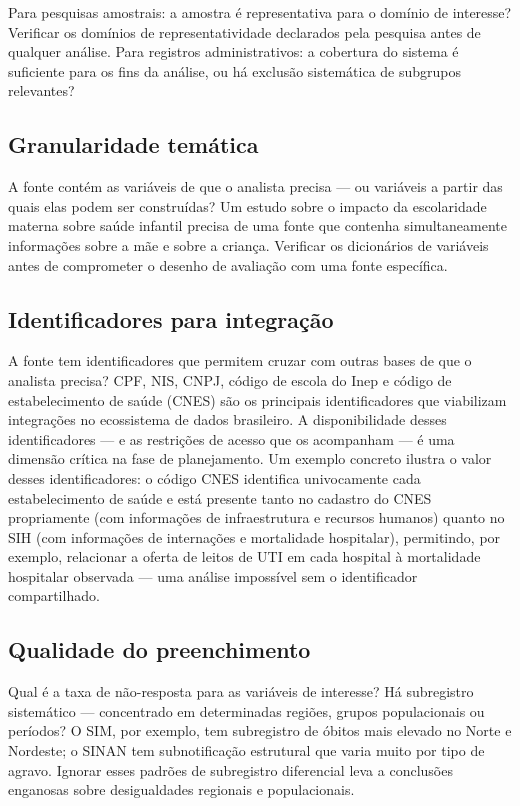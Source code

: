 Para pesquisas amostrais: a amostra é representativa para o domínio de interesse? Verificar os domínios de representatividade declarados pela pesquisa antes de qualquer análise. Para registros administrativos: a cobertura do sistema é suficiente para os fins da análise, ou há exclusão sistemática de subgrupos relevantes?

\subsection{Granularidade temática}

A fonte contém as variáveis de que o analista precisa --- ou variáveis a partir das quais elas podem ser construídas? Um estudo sobre o impacto da escolaridade materna sobre saúde infantil precisa de uma fonte que contenha simultaneamente informações sobre a mãe e sobre a criança. Verificar os dicionários de variáveis antes de comprometer o desenho de avaliação com uma fonte específica.

\subsection{Identificadores para integração}

A fonte tem identificadores que permitem cruzar com outras bases de que o analista precisa? CPF, NIS, CNPJ, código de escola do Inep e código de estabelecimento de saúde (CNES) são os principais identificadores que viabilizam integrações no ecossistema de dados brasileiro. A disponibilidade desses identificadores --- e as restrições de acesso que os acompanham --- é uma dimensão crítica na fase de planejamento. Um exemplo concreto ilustra o valor desses identificadores: o código CNES identifica univocamente cada estabelecimento de saúde e está presente tanto no cadastro do CNES propriamente (com informações de infraestrutura e recursos humanos) quanto no SIH (com informações de internações e mortalidade hospitalar), permitindo, por exemplo, relacionar a oferta de leitos de UTI em cada hospital à mortalidade hospitalar observada --- uma análise impossível sem o identificador compartilhado.

\subsection{Qualidade do preenchimento}

Qual é a taxa de não-resposta para as variáveis de interesse? Há subregistro sistemático --- concentrado em determinadas regiões, grupos populacionais ou períodos? O SIM, por exemplo, tem subregistro de óbitos mais elevado no Norte e Nordeste; o SINAN tem subnotificação estrutural que varia muito por tipo de agravo. Ignorar esses padrões de subregistro diferencial leva a conclusões enganosas sobre desigualdades regionais e populacionais.

